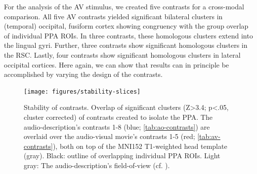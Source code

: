 \documentclass[english]{article}
\begin{document}





For the analysis of the AV stimulus, we created five contrasts for a cross-modal
comparison.
All five AV contrasts yielded significant bilateral clusters in (temporal)
occipital, fusiform cortex showing congruency with the group overlap of
individual PPA ROIs.
In three contrasts, these homologous clusters extend into the lingual
gyri.
Further, three contrasts show significant homologous clusters in the RSC.
Lastly, four contrasts show significant homologous clusters in lateral occipital
cortices.
Here again, we can show that results can in principle be accomplished by varying
the design of the contrasts.



\begin{figure} \centering
    \texttt{[image: figures/stability-slices]}
    \caption{Stability of contrasts. Overlap of significant clusters (Z>3.4;
        p<.05, cluster corrected) of contrasts created to isolate the PPA.
        The audio-description's contrasts 1-8 (blue; \ref{tab:ao-contrasts})
        are overlaid over the audio-visual movie's contrasts 1-5 (red;
        \ref{tab:av-contrasts}), both on top of the MNI152 T1-weighted head
        template (gray).
        Black: outline of overlapping individual PPA ROIs.
        Light gray: The audio-description's field-of-view (cf.
        \citep{hanke2014audiomovie}).}
    \label{fig:stability-slices}
    \end{figure}
\end{document}
